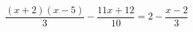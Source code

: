 \begin{ex}
	\begin{condition}
		\( \dfrac{(x+2)(x-5)}{3}-\dfrac{11x+12}{10}=2-\dfrac{x-2}{3} \)
	\end{condition}
\end{ex}